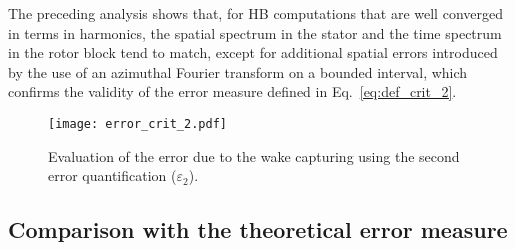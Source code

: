 The preceding analysis shows that, for HB computations 
that are well converged in terms in harmonics, 
the spatial spectrum in the stator and the 
time spectrum in the rotor block tend to match, 
except for additional spatial errors introduced
by the use of an azimuthal Fourier transform on a 
bounded interval, which confirms the 
validity of the error measure defined in Eq.~\eqref{eq:def_crit_2}.
\begin{figure}[htp]
   \centering \texttt{[image: error\_crit\_2.pdf]}
  \caption{Evaluation of the error due to the wake 
  capturing using the second error quantification ($\varepsilon_2$).}
  \label{fig:crit_2_3d}
\end{figure}

\subsection{Comparison with the theoretical error measure}
\label{sub:comp_w_analytic}


